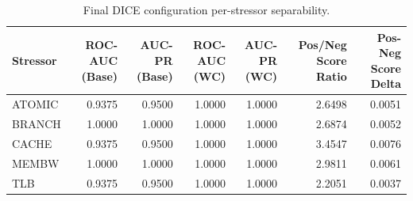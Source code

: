 \begin{table}[t]
\centering
\caption{Final DICE configuration per-stressor separability.}
\label{tab:dice_full_stressor}
\footnotesize
\begin{tabular}{lrrrrrr}
\toprule
Stressor & ROC-AUC (Base) & AUC-PR (Base) & ROC-AUC (WC) & AUC-PR (WC) & Pos/Neg Score Ratio & Pos-Neg Score Delta \\
\midrule
ATOMIC & 0.9375 & 0.9500 & 1.0000 & 1.0000 & 2.6498 & 0.0051 \\
BRANCH & 1.0000 & 1.0000 & 1.0000 & 1.0000 & 2.6874 & 0.0052 \\
CACHE & 0.9375 & 0.9500 & 1.0000 & 1.0000 & 3.4547 & 0.0076 \\
MEMBW & 1.0000 & 1.0000 & 1.0000 & 1.0000 & 2.9811 & 0.0061 \\
TLB & 0.9375 & 0.9500 & 1.0000 & 1.0000 & 2.2051 & 0.0037 \\
\bottomrule
\end{tabular}

\end{table}
